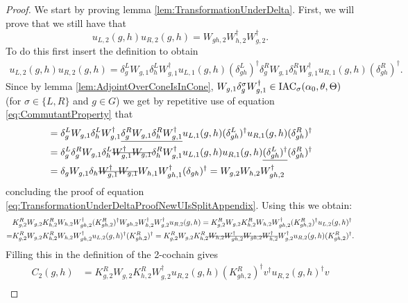 \documentclass[11pt,a4paper,twoside]{article}
\numberwithin{equation}{section}
\begin{document}
	\begin{proof}
		We start by proving lemma \ref{lem:TransformationUnderDelta}. First, we will prove that we still have that
		\begin{equation}\label{eq:TransformationUnderDeltaProofNewUIsSplitAppendix}
			u_{L,2}(g,h)u_{R,2}(g,h)=W_{gh,2}W_{h,2}^\dagger W_{g,2}^\dagger.
		\end{equation}
		To do this first insert the definition to obtain
		\begin{align}
			u_{L,2}(g,h)u_{R,2}(g,h)=\delta_g^L W_{g,1}\delta_h^L W_{g,1}^\dagger u_{L,1}(g,h)(\delta_{gh}^L)^\dagger \delta_g^R W_{g,1}\delta_h^R W_{g,1}^\dagger u_{R,1}(g,h)(\delta_{gh}^R)^\dagger.
		\end{align}
		Since by lemma \ref{lem:AdjointOverConeIsInCone}, $ W_{g,1}\delta_g^\sigma W_{g,1}^\dagger\in\textrm{IAC}_\sigma(\alpha_0,\theta,\Theta)$ (for $\sigma\in\{L,R\}$ and $g\in G$) we get by repetitive use of equation \eqref{eq:CommutantProperty} that
		\begin{align}
			&=\delta_g^L W_{g,1}\delta_h^L W_{g,1}^\dagger \underline{\delta_g^R W_{g,1}\delta_h^R W_{g,1}^\dagger} u_{L,1}(g,h)(\delta_{gh}^L)^\dagger  u_{R,1}(g,h)(\delta_{gh}^R)^\dagger\\
			&=\delta_g^L \delta_g^R W_{g,1}\delta_h^L \stkout{ W_{g,1}^\dagger W_{g,1}}\delta_h^R W_{g,1}^\dagger u_{L,1}(g,h)  u_{R,1}(g,h)\underline{(\delta_{gh}^L)^\dagger}(\delta_{gh}^R)^\dagger\\
			&=\delta_g W_{g,1}\delta_h \stkout{W_{g,1}^\dagger W_{g,1}} W_{h,1} W_{gh,1}^\dagger(\delta_{gh})^\dagger=W_{g,2}W_{h,2}W_{gh,2}^\dagger
		\end{align}
		concluding the proof of equation \eqref{eq:TransformationUnderDeltaProofNewUIsSplitAppendix}. Using this we obtain:
		\begin{align}
			&K_{g,2}^RW_{g,2}K_{h,2}^{R}W_{h,2}W_{gh,2}^\dagger(K_{gh,2}^R)^\dagger W_{gh,2}W_{h,2}^\dagger W_{g,2}^\dagger u_{R,2}(g,h)=K_{g,2}^RW_{g,2}K_{h,2}^{R}W_{h,2}W_{gh,2}^\dagger(K_{gh,2}^R)^\dagger u_{L,2}(g,h)^\dagger\\
			=&K_{g,2}^RW_{g,2}K_{h,2}^{R}W_{h,2}W_{gh,2}^\dagger u_{L,2}(g,h)^\dagger (K_{gh,2}^R)^\dagger=K_{g,2}^RW_{g,2}K_{h,2}^{R}\stkout{W_{h,2}W_{gh,2}^\dagger W_{gh,2}W_{h,2}^\dagger} W_{g,2}^\dagger u_{R,2}(g,h) (K_{gh,2}^R)^\dagger.
		\end{align}
		Filling this in the definition of the 2-cochain gives
		\begin{align}
			C_2(g,h)&=K_{g,2}^RW_{g,2}K_{h,2}^{R}W_{g,2}^\dagger u_{R,2}(g,h) (K_{gh,2}^R)^\dagger v^\dagger u_{R,2}(g,h)^\dagger v\\

\end{align}
\end{proof}
\end{document}

